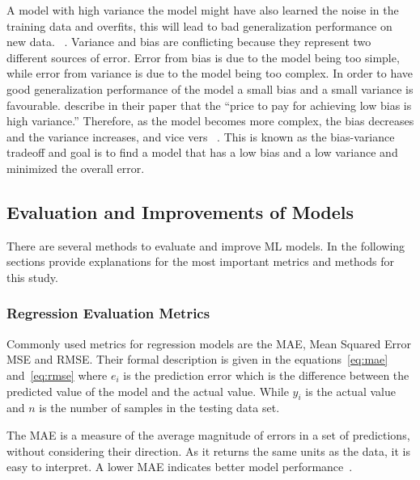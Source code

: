 A model with high variance the model might have also learned the noise in the training data and overfits, this will
lead to bad generalization performance on new data.
~\cite[p. 82]{alpaydin2020introduction}.
Variance and bias are conflicting because they represent two different sources of error.
Error from bias is due to the model being too simple, while error from variance is due to the model being too
complex.
In order to have good generalization performance of the model a small bias and a small variance is favourable.
\cite{geman1992neural} describe in their paper that the ``price to pay for achieving low bias is high variance.''
Therefore, as the model becomes more complex, the bias decreases and the variance increases, and vice vers
~\cite[p. 14]{geman1992neural}.
This is known as the bias-variance tradeoff and goal is to find a model that has a low bias and a low variance
and minimized the overall error.

\subsection{Evaluation and Improvements of Models}\label{subsec:evaluations-and-improvements-of-models}
There are several methods to evaluate and improve ML models.
In the following sections provide explanations for the most important metrics and methods for this study.

\subsubsection{Regression Evaluation Metrics}\label{subsubsec:regression-metrics}
Commonly used metrics for regression models are the \ac{MAE}, Mean Squared Error \ac{MSE} and \ac{RMSE}.
Their formal description is given in the equations~\ref{eq:mae} and~\ref{eq:rmse} where
$e_i$ is the prediction error which is the difference between the predicted value of the model and the actual value.
While $y_i$ is the actual value and $n$ is the number of samples in the testing data set.

The MAE is a measure of the average magnitude of errors in a set of predictions, without considering their direction.
As it returns the same units as the data, it is easy to interpret.
A lower MAE indicates better model performance~\cite[pp. 1248]{chai2014root}.

